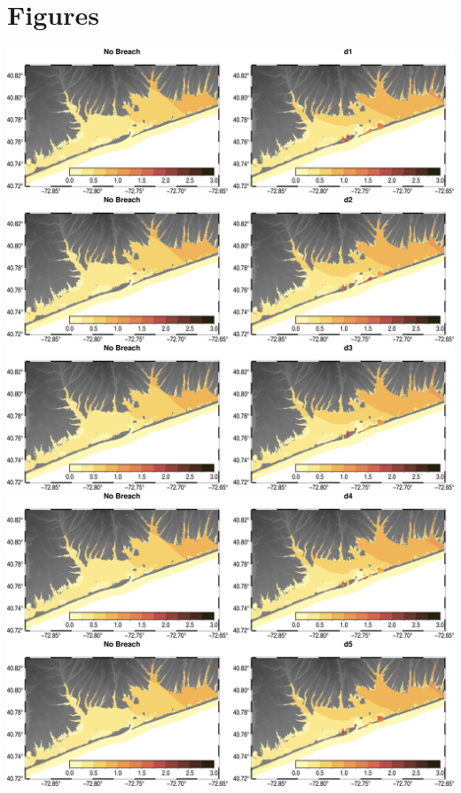 \section{Figures}
\includegraphics[width=\textwidth]{images/fgmax/d1_fgmax_no_lines.png}
\includegraphics[width=\textwidth]{images/fgmax/d2_fgmax_no_lines.png}
\includegraphics[width=\textwidth]{images/fgmax/d3_fgmax_no_lines.png}
\includegraphics[width=\textwidth]{images/fgmax/d4_fgmax_no_lines.png}
\includegraphics[width=\textwidth]{images/fgmax/d5_fgmax_no_lines.png}
